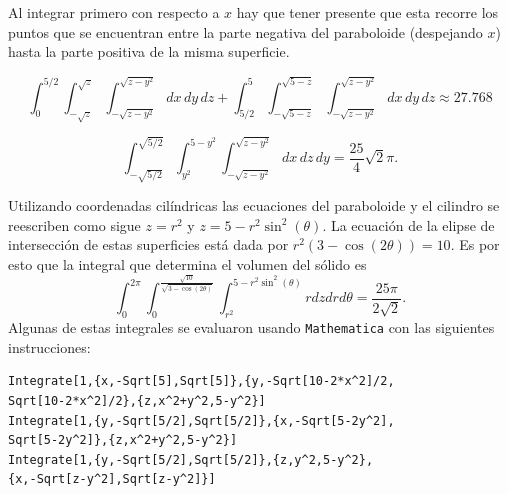 Al integrar primero con respecto a $x$ hay que tener presente que esta recorre los puntos que se encuentran entre la parte negativa del paraboloide (despejando $x$)
hasta la parte positiva de la misma superficie.

\[
\displaystyle
\int_{0}^{5/2}
\int_{-\sqrt{z}}^{\sqrt{z}}
\int_{-\sqrt{z - y^2}}^{\sqrt{z - y^2}}
dx\,dy\,dz
+
\int_{5/2}^{5}
\int_{-\sqrt{5 - z}}^{\sqrt{5 - z}}
\int_{-\sqrt{z - y^2}}^{\sqrt{z - y^2}}
dx\,dy\,dz
\approx 27.768
\]

\[
\displaystyle
\int_{-\sqrt{5/2}}^{\sqrt{5/2}}
\int_{y^2}^{5 - y^2}
\int_{-\sqrt{z - y^2}}^{\sqrt{z - y^2}}
dx\,dz\,dy
= \frac{25}{4}\sqrt{2}\pi.
\]

Utilizando coordenadas cilíndricas las ecuaciones del paraboloide y el cilindro se reescriben como sigue
$z=r^2$ y $z=5-r^2\sin^2(\theta)$. La ecuación de la elipse de intersección de estas superficies está dada por
$ r^2 (3- \cos(2 \theta))=10$.
Es por esto que la integral que determina el volumen del sólido es
\[\int_0^{2\pi}\int_0^{\frac{\sqrt{10}}{\sqrt{3-\cos(2\theta)}}}\int_{r^2}^{5-r^2\sin ^2(\theta)}rdzdrd\theta=\frac{25\pi}{2\sqrt{2}}.\]
Algunas de estas integrales se evaluaron usando \verb"Mathematica" con las siguientes instrucciones:

\begin{tcolorbox}[title=\bf Instrucción en \verb"Mathematica"]\begin{Verbatim}[formatcom=\letraverbatim]
Integrate[1,{x,-Sqrt[5],Sqrt[5]},{y,-Sqrt[10-2*x^2]/2,
Sqrt[10-2*x^2]/2},{z,x^2+y^2,5-y^2}]
Integrate[1,{y,-Sqrt[5/2],Sqrt[5/2]},{x,-Sqrt[5-2y^2],
Sqrt[5-2y^2]},{z,x^2+y^2,5-y^2}]
Integrate[1,{y,-Sqrt[5/2],Sqrt[5/2]},{z,y^2,5-y^2},
{x,-Sqrt[z-y^2],Sqrt[z-y^2]}]
\end{Verbatim}
\end{tcolorbox}

